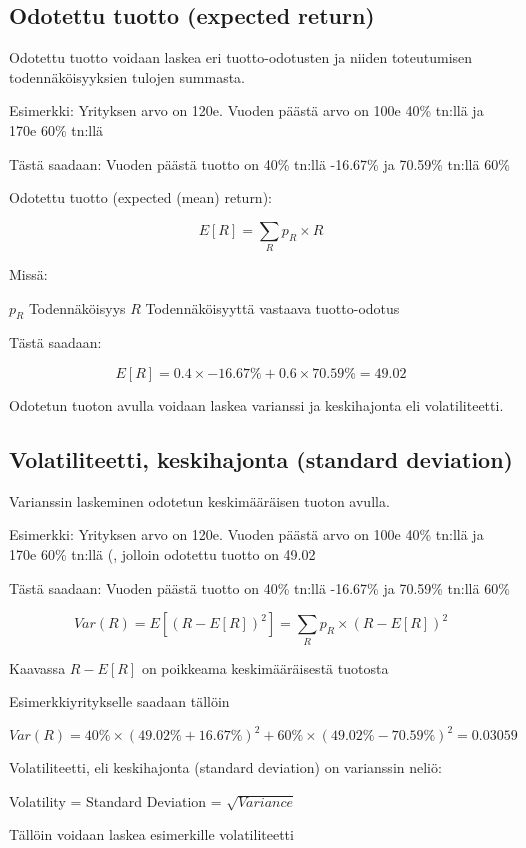 \documentclass[a4paper]{article}
\begin{document}
\subsection{Odotettu tuotto (expected return)}

Odotettu tuotto voidaan laskea eri tuotto-odotusten ja niiden toteutumisen todennäköisyyksien tulojen summasta.

Esimerkki: Yrityksen arvo on 120e. Vuoden päästä arvo on 100e 40\% tn:llä ja 170e 60\% tn:llä

Tästä saadaan: Vuoden päästä tuotto on 40\% tn:llä -16.67\% ja 70.59\% tn:llä 60\%

Odotettu tuotto (expected (mean) return):

\[
E[R] = \sum_R{p_R \times R}
\]

Missä:

$p_R$ \quad Todennäköisyys
$R$ \quad Todennäköisyyttä vastaava tuotto-odotus

Tästä saadaan:

\[
E[R] = 0.4 \times -16.67\% + 0.6 \times 70.59\% = 49.02%
\]

Odotetun tuoton avulla voidaan laskea varianssi ja keskihajonta eli volatiliteetti.

\subsection{Volatiliteetti, keskihajonta (standard deviation)}

Varianssin laskeminen odotetun keskimääräisen tuoton avulla.

Esimerkki: Yrityksen arvo on 120e. Vuoden päästä arvo on 100e 40\% tn:llä ja 170e 60\% tn:llä (, jolloin odotettu tuotto on 49.02%

Tästä saadaan: Vuoden päästä tuotto on 40\% tn:llä -16.67\% ja 70.59\% tn:llä 60\%

\[
Var(R) = E[(R - E[R])^2] = \sum_R{p_R \times (R - E[R])^2}
\]

Kaavassa $R - E[R]$ on poikkeama keskimääräisestä tuotosta

Esimerkkiyritykselle saadaan tällöin

\[
Var(R) = 40\% \times (49.02\% + 16.67\%)^2 + 60\% \times (49.02\% - 70.59\%)^2 = 0.03059
\]

Volatiliteetti, eli keskihajonta (standard deviation) on varianssin neliö:

Volatility = Standard Deviation = $\sqrt{Variance}$

Tällöin voidaan laskea esimerkille volatiliteetti
\end{document}
